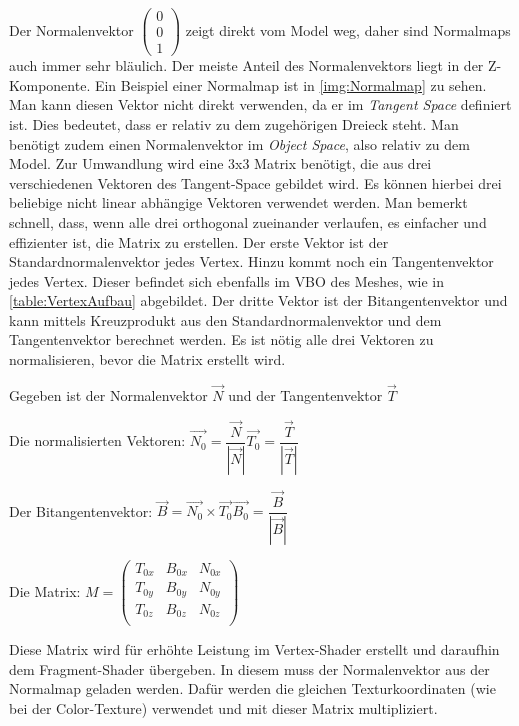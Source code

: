 Der Normalenvektor $\begin{pmatrix}
	0 \\ 0 \\ 1
\end{pmatrix}$ zeigt direkt vom Model weg, daher sind Normalmaps auch immer sehr bläulich. Der meiste Anteil des Normalenvektors liegt in der Z-Komponente. Ein Beispiel einer Normalmap ist in \cref{img:Normalmap} zu sehen. Man kann diesen Vektor nicht direkt verwenden, da er im \textit{Tangent Space} definiert ist. 
Dies bedeutet, dass er relativ zu dem zugehörigen Dreieck steht.
Man benötigt zudem einen Normalenvektor im \textit{Object Space}, also relativ zu dem Model. 
Zur Umwandlung wird eine 3x3 Matrix benötigt, die aus drei verschiedenen Vektoren des Tangent-Space gebildet wird. 
Es können hierbei drei beliebige nicht linear abhängige Vektoren verwendet werden. Man bemerkt schnell, dass, wenn alle drei orthogonal zueinander verlaufen, es einfacher und effizienter ist, die Matrix zu erstellen. 
Der erste Vektor ist der Standardnormalenvektor jedes Vertex. Hinzu kommt noch ein Tangentenvektor jedes Vertex. Dieser befindet sich ebenfalls im \ac{VBO} des Meshes, wie in \cref{table:VertexAufbau} abgebildet. Der dritte Vektor ist der Bitangentenvektor und kann mittels Kreuzprodukt aus den Standardnormalenvektor und dem Tangentenvektor berechnet werden. Es ist nötig alle drei Vektoren zu normalisieren, bevor die Matrix erstellt wird.

Gegeben ist der Normalenvektor $\overrightarrow{N}$ und der Tangentenvektor $\overrightarrow{T}$

Die normalisierten Vektoren: $\overrightarrow{N_{0}} = \dfrac{\overrightarrow{N}}{|\overrightarrow{N}|}$\qquad	$\overrightarrow{T_{0}} = \dfrac{\overrightarrow{T}}{|\overrightarrow{T}|}$

Der Bitangentenvektor: $\overrightarrow{B} = \overrightarrow{N_{0}} \times \overrightarrow{T_{0}}$\qquad	$\overrightarrow{B_{0}} = \dfrac{\overrightarrow{B}}{|\overrightarrow{B}|}$

Die Matrix: $M =  \begin{pmatrix}
T_{0x} & B_{0x} & N_{0x} \\
T_{0y} & B_{0y} & N_{0y} \\
T_{0z} & B_{0z} & N_{0z} \\
\end{pmatrix}$

Diese Matrix wird für erhöhte Leistung im Vertex-Shader erstellt und daraufhin dem Fragment-Shader übergeben. In diesem muss der Normalenvektor aus der Normalmap geladen werden. Dafür werden die gleichen Texturkoordinaten (wie bei der Color-Texture) verwendet und mit dieser Matrix multipliziert.

